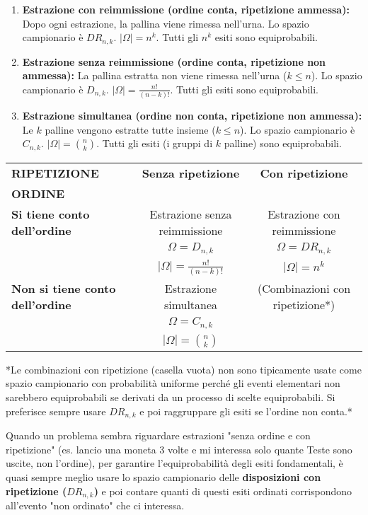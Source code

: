\begin{enumerate}
    \item \textbf{Estrazione con reimmissione (ordine conta, ripetizione ammessa):}
    Dopo ogni estrazione, la pallina viene rimessa nell'urna.
    Lo spazio campionario è $DR_{n,k}$. $|\Omega| = n^k$.
    Tutti gli $n^k$ esiti sono equiprobabili.

    \item \textbf{Estrazione senza reimmissione (ordine conta, ripetizione non ammessa):}
    La pallina estratta non viene rimessa nell'urna ($k \le n$).
    Lo spazio campionario è $D_{n,k}$. $|\Omega| = \frac{n!}{(n-k)!}$.
    Tutti gli esiti sono equiprobabili.

    \item \textbf{Estrazione simultanea (ordine non conta, ripetizione non ammessa):}
    Le $k$ palline vengono estratte tutte insieme ($k \le n$).
    Lo spazio campionario è $C_{n,k}$. $|\Omega| = \binom{n}{k}$.
    Tutti gli esiti (i gruppi di $k$ palline) sono equiprobabili.
\end{enumerate}

\begin{center}
\begin{tabular}{|l|c|c|}
\hline
\textbf{RIPETIZIONE} & \textbf{Senza ripetizione} & \textbf{Con ripetizione} \\
\textbf{ORDINE} & & \\
\hline
\textbf{Si tiene conto dell'ordine} & Estrazione senza reimmissione & Estrazione con reimmissione \\
& $\Omega = D_{n,k}$ & $\Omega = DR_{n,k}$ \\
& $|\Omega| = \frac{n!}{(n-k)!}$ & $|\Omega| = n^k$ \\
\hline
\textbf{Non si tiene conto dell'ordine} & Estrazione simultanea & (Combinazioni con ripetizione*) \\
& $\Omega = C_{n,k}$ & \\
& $|\Omega| = \binom{n}{k}$ & \\
\hline
\end{tabular}
\end{center}
*Le combinazioni con ripetizione (casella vuota) non sono tipicamente usate come spazio campionario con probabilità uniforme perché gli eventi elementari non sarebbero equiprobabili se derivati da un processo di scelte equiprobabili. Si preferisce sempre usare $DR_{n,k}$ e poi raggruppare gli esiti se l'ordine non conta.*

\begin{remark}
Quando un problema sembra riguardare estrazioni "senza ordine e con ripetizione" (es. lancio una moneta 3 volte e mi interessa solo quante Teste sono uscite, non l'ordine), per garantire l'equiprobabilità degli esiti fondamentali, è quasi sempre meglio usare lo spazio campionario delle \textbf{disposizioni con ripetizione ($DR_{n,k}$)} e poi contare quanti di questi esiti ordinati corrispondono all'evento "non ordinato" che ci interessa.
\end{remark}


